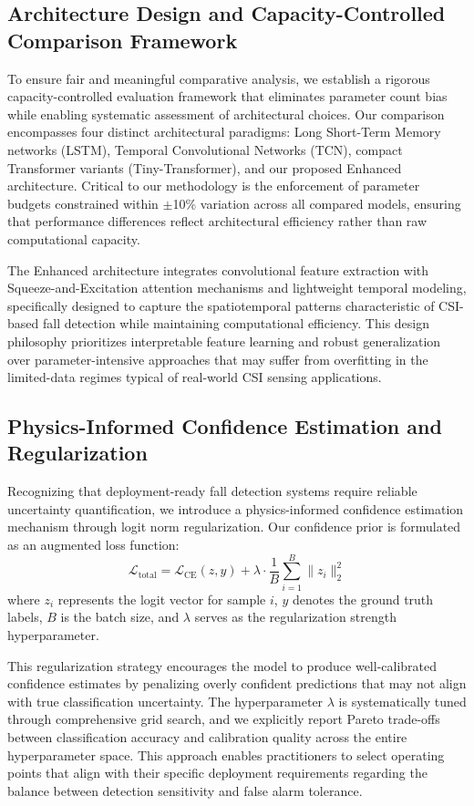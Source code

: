 \documentclass[10pt,conference]{IEEEtran}
\begin{document}
\subsection{Architecture Design and Capacity-Controlled Comparison Framework}

To ensure fair and meaningful comparative analysis, we establish a rigorous capacity-controlled evaluation framework that eliminates parameter count bias while enabling systematic assessment of architectural choices. Our comparison encompasses four distinct architectural paradigms: Long Short-Term Memory networks (LSTM), Temporal Convolutional Networks (TCN), compact Transformer variants (Tiny-Transformer), and our proposed Enhanced architecture. Critical to our methodology is the enforcement of parameter budgets constrained within $\pm$10\% variation across all compared models, ensuring that performance differences reflect architectural efficiency rather than raw computational capacity.

The Enhanced architecture integrates convolutional feature extraction with Squeeze-and-Excitation attention mechanisms and lightweight temporal modeling, specifically designed to capture the spatiotemporal patterns characteristic of CSI-based fall detection while maintaining computational efficiency. This design philosophy prioritizes interpretable feature learning and robust generalization over parameter-intensive approaches that may suffer from overfitting in the limited-data regimes typical of real-world CSI sensing applications.

\subsection{Physics-Informed Confidence Estimation and Regularization}

Recognizing that deployment-ready fall detection systems require reliable uncertainty quantification, we introduce a physics-informed confidence estimation mechanism through logit norm regularization. Our confidence prior is formulated as an augmented loss function:
$$\mathcal{L}_{\text{total}} = \mathcal{L}_{\text{CE}}(z,y) + \lambda \cdot \frac{1}{B}\sum_{i=1}^{B} \|z_i\|_2^2$$
where $z_i$ represents the logit vector for sample $i$, $y$ denotes the ground truth labels, $B$ is the batch size, and $\lambda$ serves as the regularization strength hyperparameter.

This regularization strategy encourages the model to produce well-calibrated confidence estimates by penalizing overly confident predictions that may not align with true classification uncertainty. The hyperparameter $\lambda$ is systematically tuned through comprehensive grid search, and we explicitly report Pareto trade-offs between classification accuracy and calibration quality across the entire hyperparameter space. This approach enables practitioners to select operating points that align with their specific deployment requirements regarding the balance between detection sensitivity and false alarm tolerance.
\end{document}
